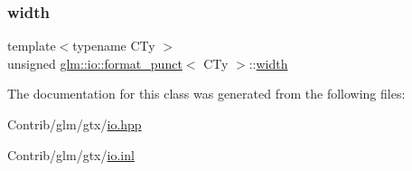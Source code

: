 \mbox{\label{classglm_1_1io_1_1format__punct_a95d32ca2330bbf7c50d3e066b7a851db}} 
\subsubsection{\texorpdfstring{width}{width}}
{\footnotesize\ttfamily template$<$typename C\+Ty $>$ \\
unsigned \mbox{\hyperlink{classglm_1_1io_1_1format__punct}{glm\+::io\+::format\+\_\+punct}}$<$ C\+Ty $>$\+::\mbox{\hyperlink{structglm_1_1io_1_1width}{width}}}



The documentation for this class was generated from the following files\+:\begin{DoxyCompactItemize}
\item 
Contrib/glm/gtx/\mbox{\hyperlink{io_8hpp}{io.\+hpp}}\item 
Contrib/glm/gtx/\mbox{\hyperlink{io_8inl}{io.\+inl}}\end{DoxyCompactItemize}
